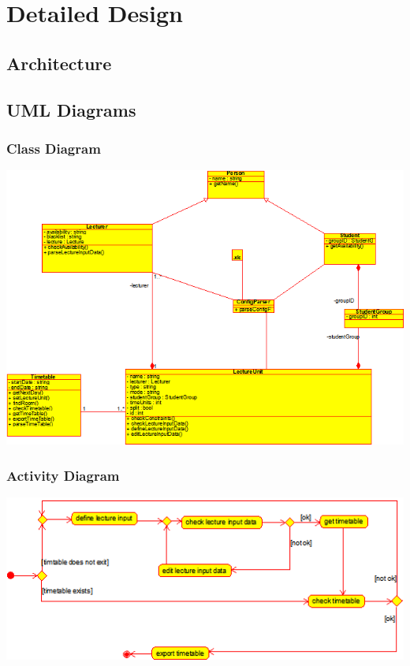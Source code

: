 \documentclass{scrreprt}
\begin{document}
	\chapter{Detailed Design}
	\section{Architecture}
	\section{UML Diagrams}
	\subsection{Class Diagram}
	\includegraphics{class diagram}
	\subsection{Activity Diagram}
	\includegraphics{activity diagram}
\end{document}
